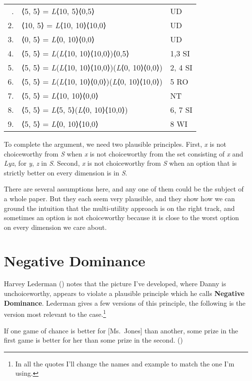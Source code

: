 \documentclass[
  11pt,
  letterpaper,
  DIV=11,
  numbers=noendperiod,
  twoside]{scrartcl}
\providecommand{\tightlist}{%
  \setlength{\itemsep}{0pt}\setlength{\parskip}{0pt}}
\begin{document}
\begin{longtable}[]{@{}rll@{}}
\toprule\noalign{}
\endhead
\bottomrule\noalign{}
\endlastfoot
1. & ⟨5, 5⟩ = \emph{L}⟨10, 5⟩⟨0,5⟩ & UD \\
2. & ⟨10, 5⟩ = \emph{L}⟨10, 10⟩⟨10,0⟩ & UD \\
3. & ⟨0, 5⟩ = \emph{L}⟨0, 10⟩⟨0,0⟩ & UD \\
4. & ⟨5, 5⟩ = \emph{L}(\emph{L}⟨10, 10⟩⟨10,0⟩)⟨0,5⟩ & 1,3 SI \\
5. & ⟨5, 5⟩ = \emph{L}(\emph{L}⟨10, 10⟩⟨10,0⟩)(\emph{L}⟨0, 10⟩⟨0,0⟩) &
2, 4 SI \\
6. & ⟨5, 5⟩ = \emph{L}(\emph{L}⟨10, 10⟩⟨0,0⟩)(\emph{L}⟨0, 10⟩⟨10,0⟩) & 5
RO \\
7. & ⟨5, 5⟩ = \emph{L}⟨10, 10⟩⟨0,0⟩ & NT \\
8. & ⟨5, 5⟩ = \emph{L}⟨5, 5⟩(\emph{L}⟨0, 10⟩⟨10,0⟩) & 6, 7 SI \\
9. & ⟨5, 5⟩ = \emph{L}⟨0, 10⟩⟨10,0⟩ & 8 WI \\
\end{longtable}

To complete the argument, we need two plausible principles. First,
\emph{x} is not choiceworthy from \emph{S} when \emph{x} is not
choiceworthy from the set consisting of \emph{x} and \emph{Lyz}, for
\emph{y}, \emph{z} in \emph{S}. Second, \emph{x} is not choiceworthy
from \emph{S} when an option that is strictly better on every dimension
is in \emph{S}.

There are several assumptions here, and any one of them could be the
subject of a whole paper. But they each seem very plausible, and they
show how we can ground the intuition that the multi-utility approach is
on the right track, and sometimes an option is not choiceworthy because
it is close to the worst option on every dimension we care about.

\section{Negative Dominance}\label{sec-negdom}

Harvey Lederman () notes that
the picture I've developed, where Danny is unchoiceworthy, appears to
violate a plausible principle which he calls \textbf{Negative
Dominance}. Lederman gives a few versions of this principle, the
following is the version most relevant to the case.\footnote{In all the
  quotes I'll change the names and example to match the one I'm using.}

\begin{description}
\tightlist
\item[Negative Dominance (Goodness)]
If one game of chance is better for {[}Ms.~Jones{]} than another, some
prize in the first game is better for her than some prize in the second.
()
\end{description}
\end{document}
